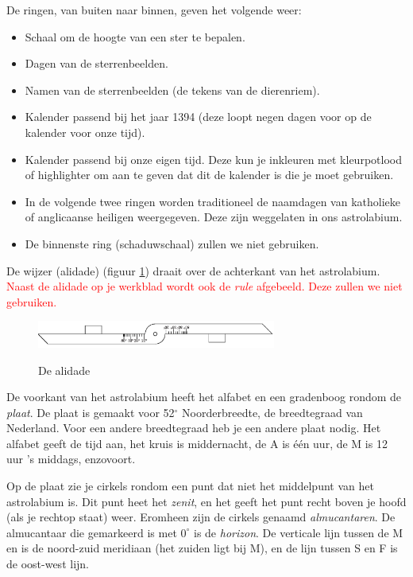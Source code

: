 De ringen, van buiten naar binnen, geven het volgende weer:
\begin{itemize}
 \item Schaal om de hoogte van een ster te bepalen.
 \item Dagen van de sterrenbeelden.
 \item Namen van de sterrenbeelden (de tekens van de dierenriem).
 \item Kalender passend bij het jaar 1394 (deze loopt negen dagen voor op de kalender voor onze tijd).
 \item Kalender passend bij onze eigen tijd. Deze kun je inkleuren met kleurpotlood of highlighter om aan te geven dat dit de kalender is die je moet gebruiken.
 \item In de volgende twee ringen worden traditioneel de naamdagen van katholieke of anglicaanse heiligen weergegeven. Deze zijn weggelaten in ons astrolabium.
 \item De binnenste ring (schaduwschaal) zullen we niet gebruiken.
\end{itemize}

De wijzer (alidade) (figuur \ref{alidade}) draait over de achterkant van het astrolabium. \textcolor{red}{Naast de alidade op je werkblad wordt ook de \textit{rule} afgebeeld. Deze zullen we niet gebruiken.}

\begin{figure}
 \includegraphics[width=0.7\textwidth]{astrolabiumNL/alidade}
 \label{alidade}
 \caption{De alidade}
\end{figure}

De voorkant van het astrolabium heeft het alfabet en een gradenboog rondom de \textit{plaat}. De plaat is gemaakt voor 52$^\circ$ Noorderbreedte, de breedtegraad van Nederland. Voor een andere breedtegraad heb je een andere plaat nodig. Het alfabet geeft de tijd aan, het kruis \kreuz is middernacht, de A is \'e\'en uur, de M is 12 uur 's middags, enzovoort.

Op de plaat zie je cirkels rondom een punt dat niet het middelpunt van het astrolabium is. Dit punt heet het \textit{zenit}, en het geeft het punt recht boven je hoofd (als je rechtop staat) weer. Eromheen zijn de cirkels genaamd \textit{almucantaren}. De almucantaar die gemarkeerd is met $0^\circ$ is de \textit{horizon}. De verticale lijn tussen de M en \kreuz is de noord-zuid meridiaan (het zuiden ligt bij M), en de lijn tussen S en F is de oost-west lijn.

